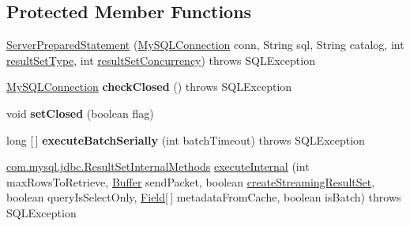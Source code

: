 \subsection*{Protected Member Functions}
\begin{DoxyCompactItemize}
\item 
\mbox{\hyperlink{classcom_1_1mysql_1_1jdbc_1_1_server_prepared_statement_a18c9d09a55d3c02fda15e64e5c818c8f}{Server\+Prepared\+Statement}} (\mbox{\hyperlink{interfacecom_1_1mysql_1_1jdbc_1_1_my_s_q_l_connection}{My\+S\+Q\+L\+Connection}} conn, String sql, String catalog, int \mbox{\hyperlink{classcom_1_1mysql_1_1jdbc_1_1_statement_impl_a9c4013da0e1b73577723769660e4ff25}{result\+Set\+Type}}, int \mbox{\hyperlink{classcom_1_1mysql_1_1jdbc_1_1_statement_impl_aca243fcfce2d3a1be8a97d643b83ddc3}{result\+Set\+Concurrency}})  throws S\+Q\+L\+Exception 
\item 
\mbox{\label{classcom_1_1mysql_1_1jdbc_1_1_server_prepared_statement_a0c6fcddadd6ff051e7f346bc3b80ff25}} 
\mbox{\hyperlink{interfacecom_1_1mysql_1_1jdbc_1_1_my_s_q_l_connection}{My\+S\+Q\+L\+Connection}} {\bfseries check\+Closed} ()  throws S\+Q\+L\+Exception 
\item 
\mbox{\label{classcom_1_1mysql_1_1jdbc_1_1_server_prepared_statement_a143a81db4dcbdabc44fb73d98e544881}} 
void {\bfseries set\+Closed} (boolean flag)
\item 
\mbox{\label{classcom_1_1mysql_1_1jdbc_1_1_server_prepared_statement_a49006a5c4e9c48acccd443ed7a11c36f}} 
long \mbox{[}$\,$\mbox{]} {\bfseries execute\+Batch\+Serially} (int batch\+Timeout)  throws S\+Q\+L\+Exception 
\item 
\mbox{\hyperlink{interfacecom_1_1mysql_1_1jdbc_1_1_result_set_internal_methods}{com.\+mysql.\+jdbc.\+Result\+Set\+Internal\+Methods}} \mbox{\hyperlink{classcom_1_1mysql_1_1jdbc_1_1_server_prepared_statement_ab1c4ba57b38c1e90faeb9e29097f2fd2}{execute\+Internal}} (int max\+Rows\+To\+Retrieve, \mbox{\hyperlink{classcom_1_1mysql_1_1jdbc_1_1_buffer}{Buffer}} send\+Packet, boolean \mbox{\hyperlink{classcom_1_1mysql_1_1jdbc_1_1_statement_impl_a642ade7ecee90913b8de38602c43ce20}{create\+Streaming\+Result\+Set}}, boolean query\+Is\+Select\+Only, \mbox{\hyperlink{classcom_1_1mysql_1_1jdbc_1_1_field}{Field}}\mbox{[}$\,$\mbox{]} metadata\+From\+Cache, boolean is\+Batch)  throws S\+Q\+L\+Exception 

\end{DoxyCompactItemize}
